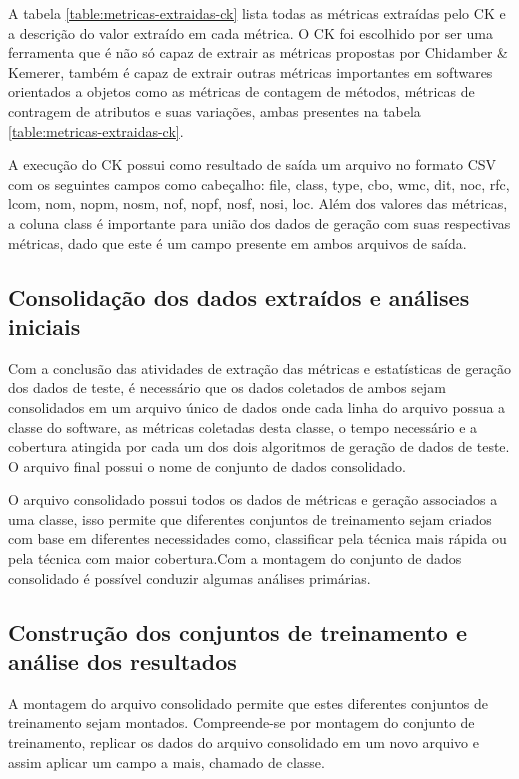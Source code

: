 \documentclass[
	12pt,				%
	oneside,			%
	a4paper,			%
	english,			%
	brazil				%
	]{abntex2ppgsi}
\begin{document}
A tabela \ref{table:metricas-extraidas-ck} lista todas as métricas extraídas pelo CK e a descrição do valor extraído em cada métrica. O CK  foi escolhido por ser uma ferramenta que é não só capaz de extrair as métricas propostas por Chidamber \& Kemerer, também é capaz de extrair outras métricas importantes em softwares orientados a objetos como as métricas de contagem de métodos, métricas de contragem de atributos e suas variações, ambas presentes na tabela \ref{table:metricas-extraidas-ck}.

A execução do CK possui como resultado de saída um arquivo no formato CSV com os seguintes campos como cabeçalho: file, class, type, cbo, wmc, dit, noc, rfc, lcom, nom, nopm, nosm, nof, nopf, nosf, nosi, loc. Além dos valores das métricas, a coluna class é importante para união dos dados de geração com suas respectivas métricas, dado que este é um campo presente em ambos arquivos de saída.

\subsection{Consolidação dos dados extraídos e análises iniciais}
Com a conclusão das atividades de extração das métricas e estatísticas de geração dos dados de teste, é necessário que os dados coletados de ambos sejam consolidados em um arquivo único de dados onde cada linha do arquivo possua a classe do software, as métricas coletadas desta classe, o tempo necessário e a cobertura atingida por cada um dos dois algoritmos de geração de dados de teste. O arquivo final possui o nome de conjunto de dados consolidado.

O arquivo consolidado possui todos os dados de métricas e geração associados a uma classe, isso permite que diferentes conjuntos de treinamento sejam criados com base em diferentes necessidades como, classificar pela técnica mais rápida ou pela técnica com maior cobertura.Com a montagem do conjunto de dados consolidado é possível conduzir algumas análises primárias. 


\subsection{Construção dos conjuntos de treinamento e análise dos resultados}

A montagem do arquivo consolidado permite que estes diferentes conjuntos de treinamento sejam montados. Compreende-se por montagem do conjunto de treinamento, replicar os dados do arquivo consolidado em um novo arquivo e assim aplicar um campo a mais, chamado de classe.  
\end{document}
